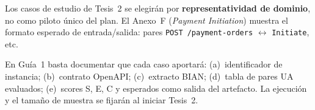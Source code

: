 Los casos de estudio de Tesis~2 se elegirán por \textbf{representatividad de dominio}, no como
piloto único del plan. El Anexo~F (\textit{Payment Initiation}) muestra el formato esperado de
entrada/salida: pares \texttt{POST /payment-orders} $\leftrightarrow$ \Behavior{} \texttt{Initiate},
etc.

En Guía~1 basta documentar que cada caso aportará: (a)~identificador de instancia; (b)~contrato
OpenAPI; (c)~extracto BIAN; (d)~tabla de pares UA evaluados; (e)~scores S, E, C y
\AlignmentScore{} esperados como salida del artefacto. La ejecución y el tamaño de muestra se
fijarán al iniciar Tesis~2.

